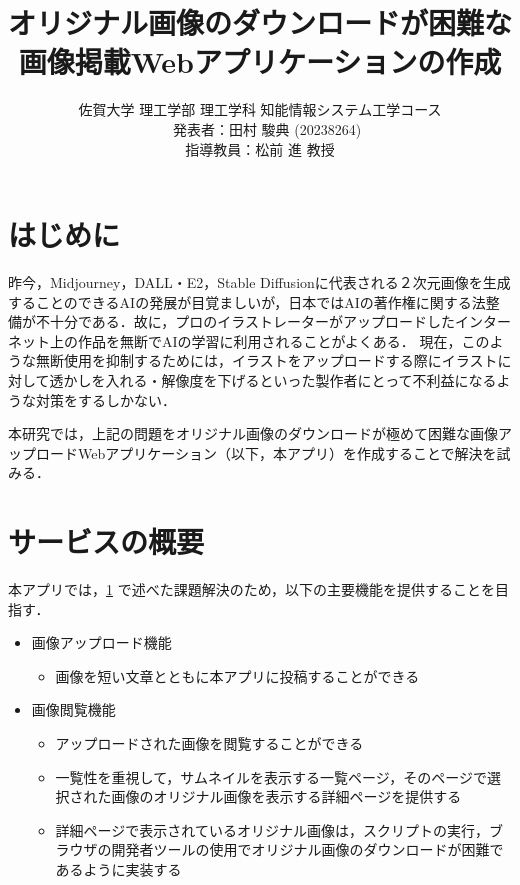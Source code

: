 ﻿\documentclass[twocolumn,a4j]{jarticle}
\title{
  オリジナル画像のダウンロードが困難な\\画像掲載Webアプリケーションの作成
}
\author{
  佐賀大学 理工学部 理工学科 知能情報システム工学コース\\
  　発表者：田村 駿典 (20238264)\\
  指導教員：松前 進 教授
}
\begin{document}
\date{\empty}
\maketitle
\thispagestyle{empty}

\section{はじめに}\label{sec:sec1}

昨今，Midjourney，DALL・E2，Stable Diffusionに代表される２次元画像を生成することのできるAIの発展が目覚ましいが，日本ではAIの著作権に関する法整備が不十分である．故に，プロのイラストレーターがアップロードしたインターネット上の作品を無断でAIの学習に利用されることがよくある\cite{nhk}．
現在，このような無断使用を抑制するためには，イラストをアップロードする際にイラストに対して透かしを入れる・解像度を下げるといった製作者にとって不利益になるような対策をするしかない．\par
本研究では，上記の問題をオリジナル画像のダウンロードが極めて困難な画像アップロードWebアプリケーション（以下，本アプリ）を作成することで解決を試みる．



\section{サービスの概要}
本アプリでは，\ref{sec:sec1} で述べた課題解決のため，以下の主要機能を提供することを目指す．
\begin{itemize}
  \item 画像アップロード機能
        \setlength{\parskip}{0cm}
        \begin{itemize}
          \item 画像を短い文章とともに本アプリに投稿することができる
        \end{itemize}
  \item 画像閲覧機能
        \begin{itemize}
          \item アップロードされた画像を閲覧することができる
          \item 一覧性を重視して，サムネイルを表示する一覧ページ，そのページで選択された画像のオリジナル画像を表示する詳細ページを提供する
          \item 詳細ページで表示されているオリジナル画像は，スクリプトの実行，ブラウザの開発者ツールの使用でオリジナル画像のダウンロードが困難であるように実装する
        \end{itemize}
\end{itemize}
\end{document}
